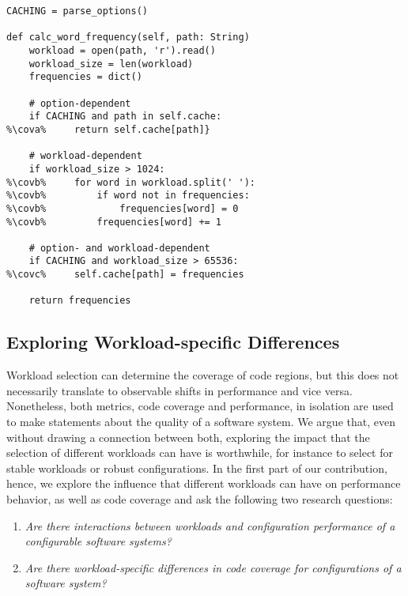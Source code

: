 \begin{lstlisting}[caption={Illustrative code example with one configuration option (line~1), option-dependent behavior (line~10), workload-dependent behavior (lines~14--17), and mixed-dependency behavior (line~21).},label=lst:intro, escapechar=\%,float]
CACHING = parse_options()
	
def calc_word_frequency(self, path: String)
	workload = open(path, 'r').read()
	workload_size = len(workload)
	frequencies = dict()
	
	# option-dependent
	if CACHING and path in self.cache:
%\cova%		return self.cache[path]}
	
	# workload-dependent
	if workload_size > 1024:	
%\covb%		for word in workload.split(' '):
%\covb%			if word not in frequencies: 
%\covb%				frequencies[word] = 0
%\covb%			frequencies[word] += 1
	
	# option- and workload-dependent
	if CACHING and workload_size > 65536:
%\covc%		self.cache[path] = frequencies
	
	return frequencies
\end{lstlisting}

\subsection{Exploring Workload-specific Differences}
Workload selection can determine the coverage of code regions, but this does not necessarily translate to observable shifts in performance and vice versa. Nonetheless, both metrics, code coverage and performance, in isolation are used to make statements about the quality of a software system. We argue that, even without drawing a connection between both, exploring the impact that the selection of different workloads can have is worthwhile, for instance to select for stable workloads or robust configurations.
In the first part of our contribution, hence, we explore the influence that different workloads can have on performance behavior, as well as code coverage and ask the following two research questions:

\begin{enumerate}[align=left,label=RQ1.\arabic*]
	\item\textit{Are there interactions between workloads and configuration performance of a configurable software systems?}\label{rq:1.1}
	\item\textit{Are there workload-specific differences in code coverage for configurations of a software system?}\label{rq:1.2}
\end{enumerate}


